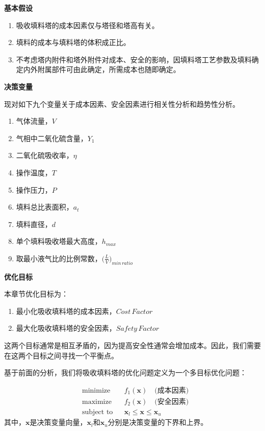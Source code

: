 \textbf{基本假设}

\begin{enumerate}
	\item 吸收填料塔的成本因素仅与塔径和塔高有关。
	\item 填料的成本与填料塔的体积成正比。
	\item 不考虑塔内附件和塔外附件对成本、安全的影响，因填料塔工艺参数及填料确定内外附属部件可由此确定，所需成本也随即确定。
\end{enumerate}

\textbf{决策变量}

现对如下九个变量关于成本因素、安全因素进行相关性分析和趋势性分析。

\begin{enumerate}
	\item 气体流量，$V$
	\item 气相中二氧化硫含量，$Y_{1}$
	\item 二氧化硫吸收率，$\eta$
	\item 操作温度，$T$
	\item 操作压力，$P$
	\item 填料总比表面积，$a_{t}$
	\item 填料直径，$d$
	\item 单个填料吸收塔最大高度，$h_{max}$
	\item 取最小液气比的比例常数，$\big(\frac{L}{V}\big)_{min\,ratio}$
\end{enumerate}

\textbf{优化目标}

本章节优化目标为：
\begin{enumerate}
	\item 最小化吸收填料塔的成本因素，$Cost\,Factor$
	\item 最大化吸收填料塔的安全因素，$Safety\,Factor$
\end{enumerate}

这两个目标通常是相互矛盾的，因为提高安全性通常会增加成本。因此，我们需要在这两个目标之间寻找一个平衡点。

基于前面的分析，我们将吸收填料塔的优化问题定义为一个多目标优化问题：

\begin{equation}
	\begin{aligned}
		& \text{minimize}   & & f_1(\mathbf{x}) \quad \text{(成本因素)} \\
		& \text{maximize}   & & f_2(\mathbf{x}) \quad \text{(安全因素)} \\
		& \text{subject to} & & \mathbf{x}_l \leq \mathbf{x} \leq \mathbf{x}_u
	\end{aligned}
\end{equation}
其中，$\mathbf{x}$是决策变量向量，$\mathbf{x}_l$和$\mathbf{x}_u$分别是决策变量的下界和上界。


